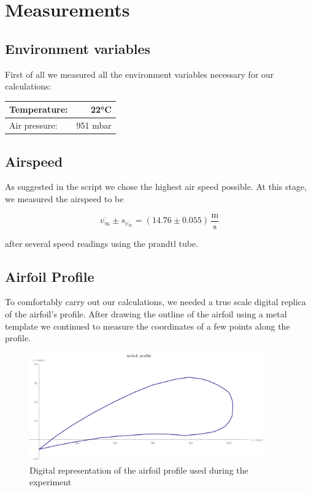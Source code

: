 \documentclass{scrreprt}
\newcommand{\unit}[1]{\ensuremath{\, \mathrm{#1}}}
\begin{document}
\section{Measurements}
\subsection{Environment variables}
First of all we measured all the environment variables necessary for our calculations:

\begin{table}[H]
\centering
\begin{tabular}{|l|r|}
\hline
Temperature: & \ang{22}C\\
\hline
Air pressure: & 951 mbar\\
\hline
\end{tabular}
\end{table}

\subsection{Airspeed}
As suggested in the script we chose the highest air speed possible. At this stage, we measured the airspeed to be 

\[\overline{v_{\infty}}\pm s_{\overline{v_{\infty}}} = (14.76 \pm 0.055)\unit{\frac{m}{s}}\]

after several speed readings using the prandtl tube.

\subsection{Airfoil Profile}
To comfortably carry out our calculations, we needed a true scale digital replica of the airfoil's profile. After drawing the outline of the airfoil using a metal template we continued to measure the coordinates of a few points along the profile.

\begin{figure}[H]
	\centering
  \includegraphics[width=0.9\textwidth]{diag/wing_profile.pdf}
	\caption{Digital representation of the airfoil profile used during the experiment}
	\label{fig:profile}
\end{figure}
\end{document}

